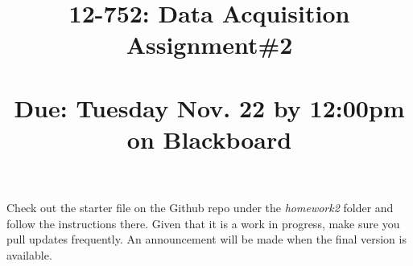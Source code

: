 \documentclass[times, 12pt, singlecolumn]{article}
\title{12-752: Data Acquisition\\ Assignment\#2\\\quad \\Due: Tuesday Nov. 22 by 12:00pm on Blackboard}
\begin{document}
\maketitle

Check out the starter file on the Github repo under the {\em homework2} folder and follow the instructions there. Given that it is a work in progress, make sure you pull updates frequently. An announcement will be made when the final version is available.
\end{document}
